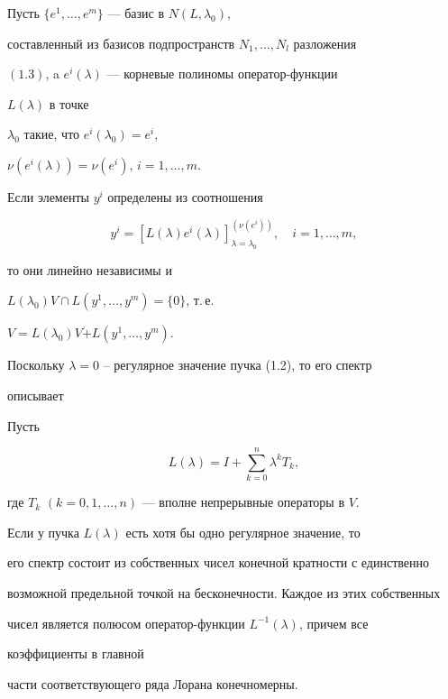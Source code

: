 \begin{lems}


Пусть $\{ e^1,\dotsc,e^m\}$ --- базис в $N(L,\lambda_0)$,


составленный из базисов подпространств $N_1,\dotsc,N_l$ разложения


$(1.3)$, a $e^i (\lambda)$ --- корневые полиномы оператор-функции


$L(\lambda)$ в точке


$\lambda_0$ такие, что $e^i (\lambda_0)=e^i$,


$\nu(e^i (\lambda))=\nu(e^i)$, $i=1,\dotsc,m.$


Если элементы $y^i$ определены из соотношения


$$


y^i=[L(\lambda)e^i(\lambda)]_{\lambda=\lambda_0}^{(\nu(e^i))},


\quad i=1,\dotsc,m,


$$


то они линейно независимы и


$L(\lambda_0)V\cap L(y^1,\dotsc,y^m)=\{ 0\}$, т.\,е.


$V=L(\lambda_0)V\Dot + L(y^1,\dotsc,y^m).$


\end{lems}





Поскольку $\lambda=0$ -- регулярное значение пучка (1.2), то его спектр


описывает





\begin{thms} Пусть


$$


L(\lambda)=I+\sum_{k=0}^{n}\lambda^k T_k,


$$


где $T_k$ $(k=0,1,\dotsc,n)$ --- вполне непрерывные операторы в $V$.


Если у пучка $L(\lambda)$ есть хотя бы одно регулярное значение, то


его спектр состоит из собственных чисел конечной кратности с единственно


возможной предельной точкой на бесконечности. Каждое из этих собственных


чисел является полюсом оператор-функции $L^{-1}(\lambda)$, причем все


коэффициенты в главной


части соответствующего ряда Лорана конечномерны.


\end{thms}





